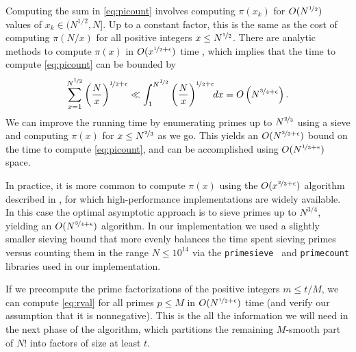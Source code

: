 \documentclass[12pt,a4paper,reqno]{amsart}
\numberwithin{equation}{section}
\theoremstyle{plain}
\theoremstyle{definition}
\begin{document}
Computing the sum in \eqref{eq:picount} involves computing $\pi(x_k)$ for $O(N^{\nicefrac{1}{2}})$ values of $x_k\in (N^{1/2},N]$.
Up to a constant factor, this is the same as the cost of computing $\pi(N/x)$ for all positive integers $x \le N^{\nicefrac{1}{2}}$.
There are analytic methods to compute $\pi(x)$ in $O(x^{\nicefrac{1}{2}+\epsilon})$ time \cite{lagarias-odlyzko}, which implies that the time to compute \eqref{eq:picount} can be bounded by
\[
\sum_{x=1}^{N^{\nicefrac{1}{2}}} \left(\frac{N}{x}\right)^{\nicefrac{1}{2}+\epsilon} \ll \int_1^{N^{\nicefrac{1}{2}}} \left(\frac{N}{x}\right)^{\nicefrac{1}{2}+\epsilon}\!\! dx = O\left(N^{\nicefrac{3}{4}+\epsilon}\right).
\]
We can improve the running time by enumerating primes up to $N^{\nicefrac{2}{3}}$ using a sieve and computing $\pi(x)$ for $x\le N^{\nicefrac{2}{3}}$ as we go.  This yields an $O(N^{\nicefrac{2}{3}+\epsilon})$ bound on the time to compute \eqref{eq:picount}, and can be accomplished using $O(N^{\nicefrac{1}{3}+\epsilon})$ space.

In practice, it is more common to compute $\pi(x)$ using the $O(x^{\nicefrac{2}{3}+\epsilon})$ algorithm described in \cite{deleglise-rivat,lagarias-miller-odlyzko}, for which high-performance implementations are widely available.  In this case the optimal asymptotic approach is to sieve primes up to $N^{3/4}$, yielding an $O(N^{\nicefrac{3}{4}+\epsilon})$ algorithm. In our implementation we used a  slightly smaller sieving bound that more evenly balances the time spent sieving primes versus counting them in the range $N\le 10^{14}$ via the \texttt{primesieve}~\cite{walisch-primesieve} and \texttt{primecount} \cite{walisch-primecount} libraries used in our implementation.

If we precompute the prime factorizations of the positive integers $m\le t/M$, we can compute \eqref{eq:rval} for all primes $p \le M$ in $O(N^{\nicefrac{1}{2}+\epsilon})$ time (and verify our assumption that it is nonnegative).  This is the all the information we will need in the next phase of the algorithm, which partitions the remaining $M$-smooth part of $N!$ into factors of size at least $t$.
\end{document}
